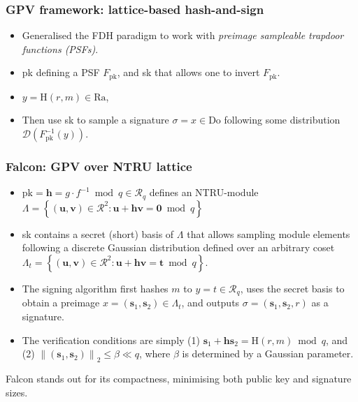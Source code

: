 \documentclass{beamer}
\begin{document}
\begin{frame}
\frametitle{GPV framework: lattice-based hash-and-sign }
\begin{itemize}
	\item Generalised the FDH paradigm to work with \emph{preimage sampleable trapdoor functions (PSFs)}. 
	\item pk defining a PSF $F_{\mathrm{pk}}$, and sk that allows one to invert $F_{\mathrm{pk}}$.
	\item $y=\mathrm{H}(r, m) \in \mathrm{Ra}$, 
	\item Then use sk to sample a signature $\sigma=x \in \mathrm{Do}$ following some distribution $\mathcal{D}(F_{\mathrm{pk}}^{-1}(y))$. 
\end{itemize}
\end{frame}

\begin{frame}
\frametitle{Falcon: GPV over NTRU lattice}
\begin{itemize}
	\item  $\mathrm{pk}=\boldsymbol{h}=g \cdot f^{-1} \bmod q \in \mathcal{R}_q$ defines an NTRU-module $\Lambda=\left\{(\boldsymbol{u}, \boldsymbol{v}) \in \mathcal{R}^2: \boldsymbol{u}+\boldsymbol{h} \boldsymbol{v}=\mathbf{0} \bmod q\right\}$ 
	\item sk contains a secret (short) basis of $\Lambda$ that allows sampling module elements following a discrete Gaussian distribution defined over an arbitrary coset $\Lambda_t=\left\{(\boldsymbol{u}, \boldsymbol{v}) \in \mathcal{R}^2: \boldsymbol{u}+\boldsymbol{h} \boldsymbol{v}=\boldsymbol{t} \bmod q\right\}$.
	\item The signing algorithm first hashes $m$ to $y=t \in \mathcal{R}_q$, uses the secret basis to obtain a preimage $x=\left(\boldsymbol{s}_1, \boldsymbol{s}_2\right) \in \Lambda_t$, and outputs $\sigma=\left(\boldsymbol{s}_1, \boldsymbol{s}_2, r\right)$ as a signature. 
	\item The verification conditions are simply (1) $\boldsymbol{s}_1+\boldsymbol{h} \boldsymbol{s}_2=\mathrm{H}(r, m) \bmod q$, and (2) $\left\|\left(\boldsymbol{s}_1, \boldsymbol{s}_2\right)\right\|_2 \leq \beta \ll q$, where $\beta$ is determined by a Gaussian parameter.
\end{itemize}
Falcon stands out for its compactness, minimising both public key and signature sizes.
\end{frame}
\end{document}
